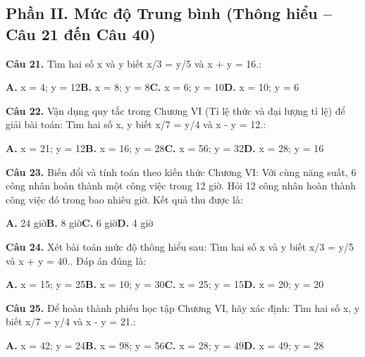 \documentclass[11pt,a4paper]{article}
\begin{document}
\subsection*{\color{accent} Phần II. Mức độ Trung bình (Thông hiểu -- Câu 21 đến Câu 40)}
\textbf{\color{primary} Câu 21.} Tìm hai số x và y biết x/3 = y/5 và x + y = 16.:\par
\hspace*{1.5em}\textbf{A.} x = 4; y = 12\quad\quad \textbf{B.} x = 8; y = 8\quad\quad \textbf{C.} x = 6; y = 10\quad\quad \textbf{D.} x = 10; y = 6\par\vspace{2pt}
\textbf{\color{primary} Câu 22.} Vận dụng quy tắc trong Chương VI (Tỉ lệ thức và đại lượng tỉ lệ) để giải bài toán: Tìm hai số x, y biết x/7 = y/4 và x - y = 12.:\par
\hspace*{1.5em}\textbf{A.} x = 21; y = 12\quad\quad \textbf{B.} x = 16; y = 28\quad\quad \textbf{C.} x = 56; y = 32\quad\quad \textbf{D.} x = 28; y = 16\par\vspace{2pt}
\textbf{\color{primary} Câu 23.} Biến đổi và tính toán theo kiến thức Chương VI: Với cùng năng suất, 6 công nhân hoàn thành một công việc trong 12 giờ. Hỏi 12 công nhân hoàn thành công việc đó trong bao nhiêu giờ. Kết quả thu được là:\par
\hspace*{1.5em}\textbf{A.} 24 giờ\quad\quad \textbf{B.} 8 giờ\quad\quad \textbf{C.} 6 giờ\quad\quad \textbf{D.} 4 giờ\par\vspace{2pt}
\textbf{\color{primary} Câu 24.} Xét bài toán mức độ thông hiểu sau: Tìm hai số x và y biết x/3 = y/5 và x + y = 40.. Đáp án đúng là:\par
\hspace*{1.5em}\textbf{A.} x = 15; y = 25\quad\quad \textbf{B.} x = 10; y = 30\quad\quad \textbf{C.} x = 25; y = 15\quad\quad \textbf{D.} x = 20; y = 20\par\vspace{2pt}
\textbf{\color{primary} Câu 25.} Để hoàn thành phiếu học tập Chương VI, hãy xác định: Tìm hai số x, y biết x/7 = y/4 và x - y = 21.:\par
\hspace*{1.5em}\textbf{A.} x = 42; y = 24\quad\quad \textbf{B.} x = 98; y = 56\quad\quad \textbf{C.} x = 28; y = 49\quad\quad \textbf{D.} x = 49; y = 28\par\vspace{2pt}
\end{document}
